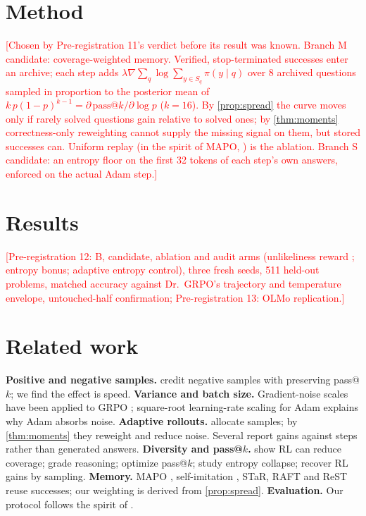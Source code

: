 \documentclass{article}
\theoremstyle{plain}
\theoremstyle{remark}
\newcommand{\pending}[1]{\textcolor{red}{[#1]}}
\begin{document}
\section{Method}\label{sec:method}
\pending{Chosen by Pre-registration 11's verdict before its result was known. Branch M candidate: coverage-weighted memory. Verified, stop-terminated successes enter an archive; each step adds $\lambda\nabla\sum_{q}\log\sum_{y\in S_q}\pi(y\mid q)$ over 8 archived questions sampled in proportion to the posterior mean of $k\,p(1-p)^{k-1}=\partial\,\mathrm{pass@}k/\partial\log p$ ($k=16$). By \cref{prop:spread} the curve moves only if rarely solved questions gain relative to solved ones; by \cref{thm:moments} correctness-only reweighting cannot supply the missing signal on them, but stored successes can. Uniform replay (in the spirit of MAPO, \citealp{liang2018mapo}) is the ablation. Branch S candidate: an entropy floor on the first 32 tokens of each step's own answers, enforced on the actual Adam step.}

\section{Results}\label{sec:results}
\pending{Pre-registration 12: B, candidate, ablation and audit arms (unlikeliness reward \citealp{he2025unlikely}; entropy bonus; adaptive entropy control), three fresh seeds, 511 held-out problems, matched accuracy against Dr.\ GRPO's trajectory and temperature envelope, untouched-half confirmation; Pre-registration 13: OLMo replication.}

\section{Related work}
\textbf{Positive and negative samples.} \citet{zhu2025nsr} credit negative samples with preserving pass@$k$; we find the effect is speed. \textbf{Variance and batch size.} Gradient-noise scales \citep{mccandlish2018empirical} have been applied to GRPO \citep{bansal2026critical}; square-root learning-rate scaling for Adam \citep{malladi2022sde} explains why Adam absorbs noise. \textbf{Adaptive rollouts.} \citet{yu2025dapo,xiong2025reinforceada,sara2026,chen2026sera,knapsack2025,greso2025} allocate samples; by \cref{thm:moments} they reweight and reduce noise. Several report gains against steps rather than generated answers. \textbf{Diversity and pass@$k$.} \citet{yue2025limit} show RL can reduce coverage; \citet{wen2025cotpassk} grade reasoning; \citet{walder2025pkpo,thrampoulidis2025shaping} optimize pass@$k$; \citet{cui2025entropy} study entropy collapse; \citet{karan2025sampling} recover RL gains by sampling. \textbf{Memory.} MAPO \citep{liang2018mapo}, self-imitation \citep{oh2018sil}, STaR, RAFT and ReST \citep{zelikman2022star,dong2023raft,gulcehre2023rest} reuse successes; our weighting is derived from \cref{prop:spread}. \textbf{Evaluation.} Our protocol follows the spirit of \citet{henderson2018matters,lucic2018gans}.
\end{document}
